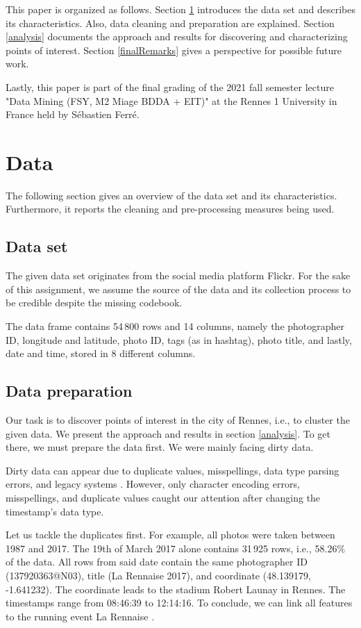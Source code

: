 \documentclass[runningheads]{llncs}
\begin{document}
This paper is organized as follows. Section \ref{data} introduces the data set and describes its characteristics. Also, data cleaning and preparation are explained. Section \ref{analysis} documents the approach and results for discovering and characterizing points of interest. Section \ref{finalRemarks} gives a perspective for possible future work.

Lastly, this paper is part of the final grading of the 2021 fall semester lecture "Data Mining (FSY, M2 Miage BDDA + EIT)" at the Rennes 1 University in France held by Sébastien Ferré.

\section{Data}\label{data}
The following section gives an overview of the data set and its characteristics. Furthermore, it reports the cleaning and pre-processing measures being used.

\subsection{Data set}
The given data set originates from the social media platform Flickr. For the sake of this assignment, we assume the source of the data and its collection process to be credible despite the missing codebook.

The data frame contains 54\,800 rows and 14 columns, namely the photographer ID, longitude and latitude, photo ID, tags (as in hashtag), photo title, and lastly, date and time, stored in 8 different columns.

\subsection{Data preparation}\label{data preparation}
Our task is to discover points of interest in the city of Rennes, i.e., to cluster the given data. We present the approach and results in section \ref{analysis}. To get there, we must prepare the data first. We were mainly facing dirty data.

Dirty data can appear due to duplicate values, misspellings, data type parsing errors, and legacy systems \cite{dirty_data}. However, only character encoding errors, misspellings, and duplicate values caught our attention after changing the timestamp's data type.

Let us tackle the duplicates first. For example, all photos were taken between 1987 and 2017. The 19th of March 2017 alone contains 31\,925 rows, i.e., 58.26\% of the data. All rows from said date contain the same photographer ID (137920363@N03), title (La Rennaise 2017), and coordinate (48.139179, -1.641232). The coordinate leads to the stadium Robert Launay in Rennes. The timestamps range from 08:46:39 to 12:14:16. To conclude, we can link all features to the running event La Rennaise \cite{athle}.
\end{document}
